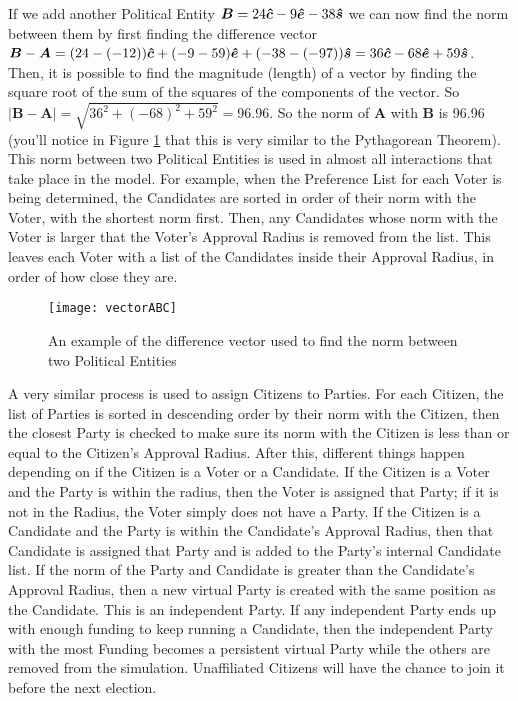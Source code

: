 \documentclass[12pt]{article}
\newcommand{\civ}{\vhat{c}}
\newcommand{\econ}{\vhat{e}}
\newcommand{\soc}{\vhat{s}}
\begin{document}
\qquad If we add another Political Entity $\bm{B} = 24\civ - 9\econ - 38\soc$ we can now find the norm between them by first finding the difference vector $\bm{B} - \bm{A} = (24 - (- 12))\civ + (-9 - 59)\econ + (-38 - (- 97))\soc = 36\civ - 68\econ + 59\soc$. Then, it is possible to find the magnitude (length) of a vector by finding the square root of the sum of the squares of the components of the vector. So $|\bm{B} - \bm{A}| = \sqrt{36^2 + (-68)^2 + 59^2} = 96.96$. So the norm of $\bm{A}$ with $\bm{B}$ is 96.96 (you'll notice in Figure \ref{exNorm} that this is very similar to the Pythagorean Theorem). This norm between two Political Entities is used in almost all interactions that take place in the model. For example, when the Preference List for each Voter is being determined, the Candidates are sorted in order of their norm with the Voter, with the shortest norm first. Then, any Candidates whose norm with the Voter is larger that the Voter's Approval Radius is removed from the list. This leaves each Voter with a list of the Candidates inside their Approval Radius, in order of how close they are.
\begin{figure}[H]
\centering
\texttt{[image: vectorABC]}
\caption{\footnotesize An example of the difference vector used to find the norm between two Political Entities}
\label{exNorm}
\end{figure}

\qquad A very similar process is used to assign Citizens to Parties. For each Citizen, the list of Parties is sorted in descending order by their norm with the Citizen, then the closest Party is checked to make sure its norm with the Citizen is less than or equal to the Citizen's Approval Radius. After this, different things happen depending on if the Citizen is a Voter or a Candidate. If the Citizen is a Voter and the Party is within the radius, then the Voter is assigned that Party; if it is not in the Radius, the Voter simply does not have a Party. If the Citizen is a Candidate and the Party is within the Candidate's Approval Radius, then that Candidate is assigned that Party and is added to the Party's internal Candidate list. If the norm of the Party and Candidate is greater than the Candidate's Approval Radius, then a new virtual Party is created with the same position as the Candidate. This is an independent Party. If any independent Party ends up with enough funding to keep running a Candidate, then the independent Party with the most Funding becomes a persistent virtual Party while the others are removed from the simulation. Unaffiliated Citizens will have the chance to join it before the next election. \\
\end{document}
